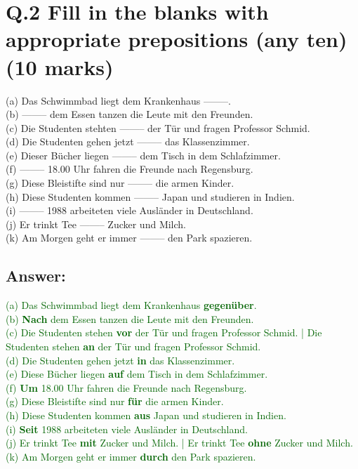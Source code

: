 \documentclass[a4paper,12pt]{article}
\begin{document}
\vspace{0.5cm}

\section*{Q.2 Fill in the blanks with appropriate prepositions (any ten) (10 marks)}

(a) Das Schwimmbad liegt dem Krankenhaus --------.\\
(b) -------- dem Essen tanzen die Leute mit den Freunden.\\
(c) Die Studenten stehten -------- der Tür und fragen Professor Schmid.\\
(d) Die Studenten gehen jetzt -------- das Klassenzimmer.\\
(e) Dieser Bücher liegen -------- dem Tisch in dem Schlafzimmer.\\
(f) -------- 18.00 Uhr fahren die Freunde nach Regensburg.\\
(g) Diese Bleistifte sind nur -------- die armen Kinder.\\
(h) Diese Studenten kommen -------- Japan und studieren in Indien.\\
(i) -------- 1988 arbeiteten viele Ausländer in Deutschland.\\
(j) Er trinkt Tee -------- Zucker und Milch.\\
(k) Am Morgen geht er immer -------- den Park spazieren.

\subsection*{Answer:}
\textcolor{darkgreen}{(a) Das Schwimmbad liegt dem Krankenhaus \textbf{gegenüber}.}\\
\textcolor{darkgreen}{(b) \textbf{Nach} dem Essen tanzen die Leute mit den Freunden.}\\
\textcolor{darkgreen}{(c) Die Studenten stehen \textbf{vor} der Tür und fragen Professor Schmid. | Die Studenten stehen \textbf{an} der Tür und fragen Professor Schmid.}\\
\textcolor{darkgreen}{(d) Die Studenten gehen jetzt \textbf{in} das Klassenzimmer.}\\
\textcolor{darkgreen}{(e) Diese Bücher liegen \textbf{auf} dem Tisch in dem Schlafzimmer.}\\
\textcolor{darkgreen}{(f) \textbf{Um} 18.00 Uhr fahren die Freunde nach Regensburg.}\\
\textcolor{darkgreen}{(g) Diese Bleistifte sind nur \textbf{für} die armen Kinder.}\\
\textcolor{darkgreen}{(h) Diese Studenten kommen \textbf{aus} Japan und studieren in Indien.}\\
\textcolor{darkgreen}{(i) \textbf{Seit} 1988 arbeiteten viele Ausländer in Deutschland.}\\
\textcolor{darkgreen}{(j) Er trinkt Tee \textbf{mit} Zucker und Milch. | Er trinkt Tee \textbf{ohne} Zucker und Milch.}\\
\textcolor{darkgreen}{(k) Am Morgen geht er immer \textbf{durch} den Park spazieren.}\\
\vspace{0.5cm}
\end{document}
